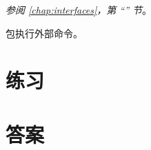 \begin{description}
{\emph{参阅 \ref{chap:interfaces}，第 ``'' 节}。
}
\item[\package{exec}]{
 包执行外部命令。
}
\end{description}

\section{练习}





\cleardoublepage
\section{答案}
\shipoutAnswer
